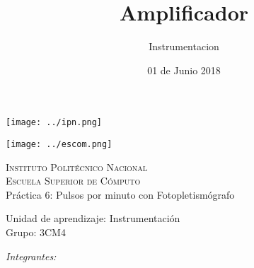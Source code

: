 \documentclass[12pt]{article}
\date{ 01 de Junio 2018}
\title{Amplificador}
\author{Instrumentacion}
\begin{document}
        \begin{titlepage}
            \begin{center}
                
                
                \noindent
                \begin{minipage}{0.5\textwidth}
                    \begin{flushleft} \large
                        \texttt{[image: ../ipn.png]}
                    \end{flushleft}
                \end{minipage}%
                \begin{minipage}{0.55\textwidth}
                    \begin{flushright} \large
                        \texttt{[image: ../escom.png]}
                    \end{flushright}
                \end{minipage}
                
                \textsc{\LARGE Instituto Politécnico Nacional}\\[0.5cm]
                
                \textsc{\Large Escuela Superior de Cómputo}\\[1cm]
                
                
                { \huge Práctica 6: Pulsos por minuto con Fotopletismógrafo \\[1cm] }
                
                { \Large Unidad de aprendizaje: Instrumentación} \\[1cm]
                
                { \Large Grupo: 3CM4 } \\[1cm]
                
                \noindent
                \begin{minipage}{0.5\textwidth}
                    \begin{flushleft} \large
                        \emph{Integrantes:}\\
                        

\end{flushleft}
\end{minipage}
\end{center}
\end{titlepage}
\end{document}
